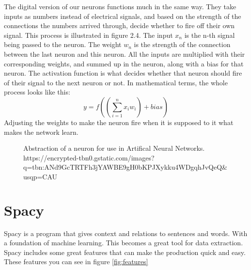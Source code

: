 The digital version of our neurons functions much in the same way.
They take inputs as numbers instead of electrical signals, and based on the strength of the connections the numbers arrived through, decide whether to fire off their own signal.
This process is illustrated in figure 2.4.
The input $x_n$ is the n-th signal being passed to the neuron.
The weight $w_n$ is the strength of the connection between the last neuron and this neuron.
All the inputs are multiplied with their corresponding weights, and summed up in the neuron, along with a bias for that neuron.
The activation function is what decides whether that neuron should fire of their signal to the next neuron or not.
In mathematical terms, the whole process looks like this: \[y = f(\left(\sum_{i=1}^{n} x_i w_i\right) + bias)\]
Adjusting the weights to make the neuron fire when it is supposed to it what makes the network learn.

\begin{figure}[h]
    \caption{Abstraction of a neuron for use in Artifical Neural Networks. https://encrypted-tbn0.gstatic.com/images?q=tbn:ANd9GcTRTFh3jYAWBE9gH0bKPJXykku4WDgqhJvQeQ&usqp=CAU}
    \label{fig:figure2.4}
\end{figure}

\section{Spacy}\label{sec:spacy}

Spacy is a program that gives context and relations to sentences and words.
With a foundation of machine learning.
This becomes a great tool for data extraction.
Spacy includes some great features that can make the production quick and easy.
These features you can see in figure \ref{fig:features}
\clearpage

